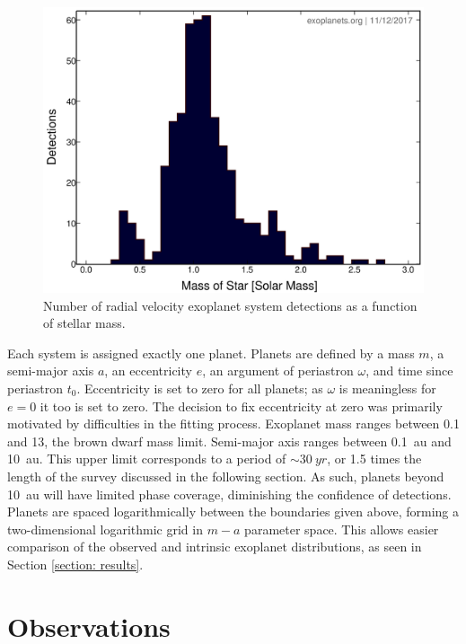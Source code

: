 \documentclass[12pt,manuscript]{aastex}
\begin{document}
\begin{figure}[ht]
  \centering
  \includegraphics[width=0.5\linewidth]{../figures/solar_mass_detections}
  \caption{Number of radial velocity exoplanet system detections as a function of stellar mass.}
  \label{fig: solar mass}
\end{figure}

Each system is assigned exactly one planet. 
Planets are defined by a mass $m$, a semi-major axis $a$, an eccentricity $e$, an argument of periastron $\omega$, and time since periastron $t_0$. 
Eccentricity is set to zero for all planets; as $\omega$ is meaningless for $e=0$ it too is set to zero. 
The decision to fix eccentricity at zero was primarily motivated by difficulties in the fitting process. 
Exoplanet mass ranges between \SI{0.1}{\Mearth} and \SI{13}{\Mjup}, the brown dwarf mass limit. 
Semi-major axis ranges between \SI{0.1}{au} and \SI{10}{au}. 
This upper limit corresponds to a period of $\sim \SI{30}{yr}$, or 1.5 times the length of the survey discussed in the following section. 
As such, planets beyond \SI{10}{au} will have limited phase coverage, diminishing the confidence of detections.
Planets are spaced logarithmically between the boundaries given above, forming a two-dimensional logarithmic grid in $m-a$ parameter space. This allows easier comparison of the observed and intrinsic exoplanet distributions, as seen in Section \ref{section: results}.

\FloatBarrier
\section{Observations}
\label{section: survey}
\end{document}
